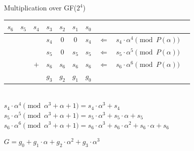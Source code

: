 \documentclass[xcolor=dvipsnames]{beamer}
\begin{document}
\begin{frame}{\large {Multiplication over GF($2^4$)}}

 {\begin{tabular}{c c c| c c c c |c c c}
  $s_6$& $s_5$  & $s_4$  & $s_3$ & $s_2$  & $s_1$   & $s_0$ & &  \\
 \hline
 & & &$s_4$ & $0$&$0$ &$s_4$  &$\Leftarrow$ & $s_4\cdot \alpha^4 \pmod{ P(\alpha)}$\\
 & & &$s_5$ & $0$&$s_5$ &$s_5$ & $\Leftarrow$ & $s_5\cdot \alpha^5 \pmod{ P(\alpha)}$\\
 & &$+$ &$s_6$ & $s_6$&$s_6$ &$s_6$  & $\Leftarrow$ & $s_6\cdot \alpha^6
 \pmod{ P(\alpha)}$\\
 \hline
 & & & $g_3$ & $g_2$ &$g_1$ & $g_0$
 \end{tabular}\par}

\ \\

$s_4\cdot \alpha^4 \pmod {\alpha^3+\alpha+1}=s_4\cdot \alpha^3+s_4$ \\
$s_5\cdot \alpha^5 \pmod {\alpha^3+\alpha+1}=s_5\cdot \alpha^3+s_5\cdot \alpha+s_5$ \\
$s_6\cdot \alpha^6 \pmod {\alpha^3+\alpha+1}=s_6\cdot \alpha^3+s_6\cdot \alpha^2+s_6\cdot \alpha+s_6$ 
\bigskip

$G=g_0+g_1\cdot \alpha+g_2\cdot \alpha^2+g_3\cdot \alpha^3$
\end{frame}




\end{document}

